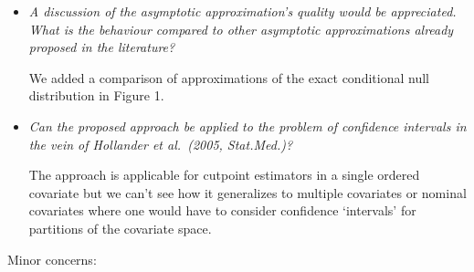 \documentclass[11pt,a4paper]{article}
\begin{document}
\begin{itemize}
  \item \textit{A discussion of the asymptotic approximation's quality would be appreciated.
        What is the behaviour compared to other asymptotic approximations already
        proposed in the literature?}
	
	We added a comparison of approximations of the exact conditional
        null distribution in Figure 1.
	
  \item \textit{Can the proposed approach be applied to the problem of confidence
        intervals in the vein of Hollander et al.\ (2005, Stat.Med.)?}
	
	The approach is applicable for cutpoint estimators in a single ordered
        covariate but we can't see how it generalizes to multiple covariates
        or nominal covariates where one would have to consider confidence `intervals'
        for partitions of the covariate space.
	
\end{itemize}

Minor concerns:
\end{document}
